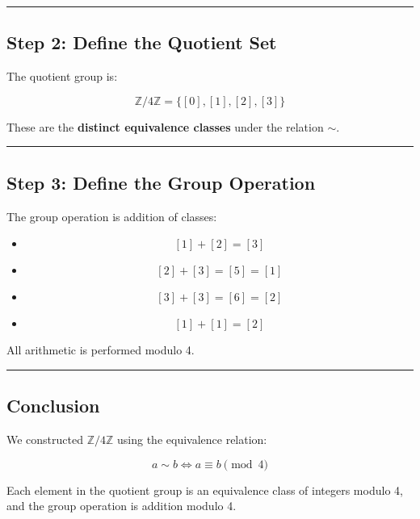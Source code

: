 \documentclass[
]{article}
\providecommand{\tightlist}{%
  \setlength{\itemsep}{0pt}\setlength{\parskip}{0pt}}
\begin{document}
\begin{center}\rule{0.5\linewidth}{0.5pt}\end{center}

\subsection{Step 2: Define the Quotient
Set}\label{step-2-define-the-quotient-set}

The quotient group is:

\[
\mathbb{Z}/4\mathbb{Z} = \{ [0], [1], [2], [3] \}
\]

These are the \textbf{distinct equivalence classes} under the relation
\(\sim\).

\begin{center}\rule{0.5\linewidth}{0.5pt}\end{center}

\subsection{Step 3: Define the Group
Operation}\label{step-3-define-the-group-operation}

The group operation is addition of classes:

\begin{itemize}
\tightlist
\item
  \[ [1] + [2] = [3] \]
\item
  \[ [2] + [3] = [5] = [1] \]
\item
  \[ [3] + [3] = [6] = [2] \]
\item
  \[ [1] + [1] = [2] \]
\end{itemize}

All arithmetic is performed modulo 4.

\begin{center}\rule{0.5\linewidth}{0.5pt}\end{center}

\subsection{Conclusion}\label{conclusion}

We constructed \(\mathbb{Z}/4\mathbb{Z}\) using the equivalence
relation:

\[
a \sim b \iff a \equiv b \pmod{4}
\]

Each element in the quotient group is an equivalence class of integers
modulo 4, and the group operation is addition modulo 4.
\end{document}
